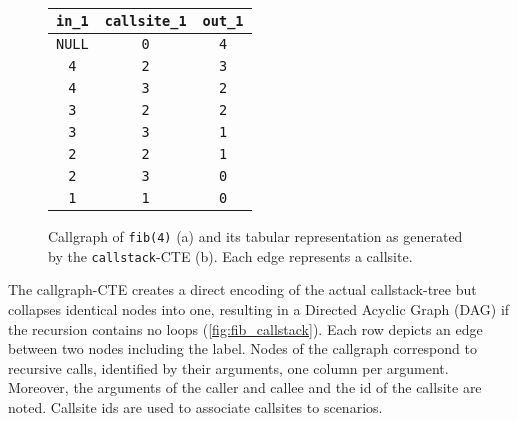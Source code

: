 \begin{figure}[h!]\small
    \begin{minipage}[b]{.5\linewidth}
    \centering
    
    \label{fig:fib_callstack_graph}
    \end{minipage}%
    \begin{minipage}[b]{.5\linewidth}
    \centering
     
    \begin{tabular}{c|c|c}
        \texttt{in\_1} & \texttt{callsite\_1} & \texttt{out\_1} \\
        \hline
        \hline
        \texttt{NULL} & \texttt{0} & \texttt{4}\\
        \texttt{4} & \texttt{2} & \texttt{3}\\
        \texttt{4} & \texttt{3} & \texttt{2}\\
        \hline
        \hline
        \texttt{3} & \texttt{2} & \texttt{2}\\
        \texttt{3} & \texttt{3} & \texttt{1}\\
        \texttt{2} & \texttt{2} & \texttt{1}\\
        \texttt{2} & \texttt{3} & \texttt{0}\\
        \hline
        \texttt{1} & \texttt{1} & \texttt{0}\\
        \hline
    \end{tabular}
    \label{fig:fib_callstack_table}
    \end{minipage}
    \caption{Callgraph of \texttt{fib(4)} (a) and its tabular representation as generated by the \texttt{callstack}-CTE (b). Each edge represents a callsite.}\label{fig:fib_callstack}
\end{figure}

The callgraph-CTE creates a direct encoding of the actual callstack-tree but collapses identical nodes into one, resulting in a Directed Acyclic Graph (DAG) if the recursion contains no loops (\autoref{fig:fib_callstack}). Each row depicts an edge between two nodes including the label. Nodes of the callgraph correspond to recursive calls, identified by their arguments, one column per argument. Moreover, the arguments of the caller and callee and the id of the callsite are noted. Callsite ids are used to associate callsites to scenarios.


